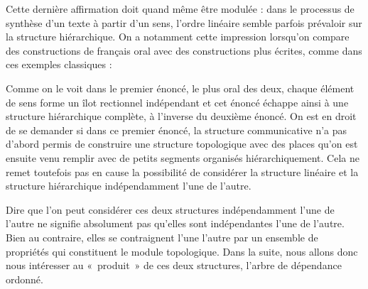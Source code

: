 {    Cette dernière affirmation doit quand même être modulée : dans le processus de synthèse d’un texte à partir d’un sens, l’ordre linéaire semble parfois prévaloir sur la structure hiérarchique. On a notamment cette impression lorsqu’on compare des constructions de français oral avec des constructions plus écrites, comme dans ces exemples classiques :

    \z

    \z

    Comme on le voit dans le premier énoncé, le plus oral des deux, chaque élément de sens forme un îlot rectionnel indépendant et cet énoncé échappe ainsi à une structure hiérarchique complète, à l’inverse du deuxième énoncé. On est en droit de se demander si dans ce premier énoncé, la structure communicative n’a pas d’abord permis de construire une structure topologique avec des places qu’on est ensuite venu remplir avec de petits segments organisés hiérarchiquement. Cela ne remet toutefois pas en cause la possibilité de considérer la structure linéaire et la structure hiérarchique indépendamment l’une de l’autre.

    Dire que l’on peut considérer ces deux structures indépendamment l’une de l’autre ne signifie absolument pas qu’elles sont indépendantes l’une de l’autre. Bien au contraire, elles se contraignent l’une l’autre par un ensemble de propriétés qui constituent le module topologique. Dans la suite, nous allons donc nous intéresser au «~produit~» de ces deux structures, l’arbre de dépendance ordonné.
}
